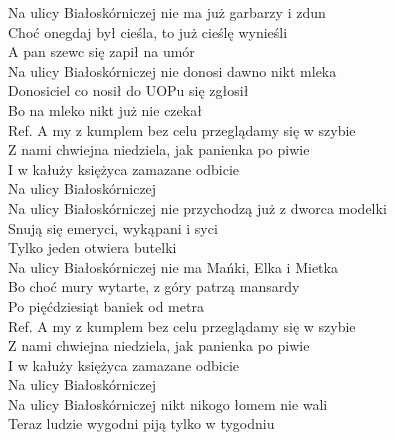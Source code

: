 
\begin{flushleft}
Na ulicy Białoskórniczej nie ma już garbarzy i zdun  \\
Choć onegdaj był cieśla, to już cieślę wynieśli \tab{}  \\
A pan szewc się zapił na umór \tab{} \tab{}\\
\vskip 3mm
Na ulicy Białoskórniczej nie donosi dawno nikt mleka  \\
Donosiciel co nosił do UOPu się zgłosił \tab{} \\
Bo na mleko nikt już nie czekał   \tab{} \\
\vskip 3mm
Ref. A my z kumplem bez celu przeglądamy się w szybie \\
\hspace{0.9cm}Z nami chwiejna niedziela, jak panienka po piwie  \\
\hspace{0.9cm}I w kałuży księżyca zamazane odbicie\tab{}  \\
\hspace{0.9cm}Na ulicy Białoskórniczej\tab{} \tab{}\\
\vskip 3mm
Na ulicy Białoskórniczej nie przychodzą już z dworca modelki \\
Snują się emeryci, wykąpani i syci \\
Tylko jeden otwiera butelki \\
\vskip 3mm
Na ulicy Białoskórniczej nie ma Mańki, Elka i Mietka \\
Bo choć mury wytarte, z góry patrzą mansardy \\
Po pięćdziesiąt baniek od metra \\
\vskip 3mm
Ref. A my z kumplem bez celu przeglądamy się w szybie\\
\hspace{0.9cm}Z nami chwiejna niedziela, jak panienka po piwie \\
\hspace{0.9cm}I w kałuży księżyca zamazane odbicie \\
\hspace{0.9cm}Na ulicy Białoskórniczej \\
\vskip 3mm
Na ulicy Białoskórniczej nikt nikogo łomem nie wali \\
Teraz ludzie wygodni piją tylko w tygodniu \\

\end{flushleft}
